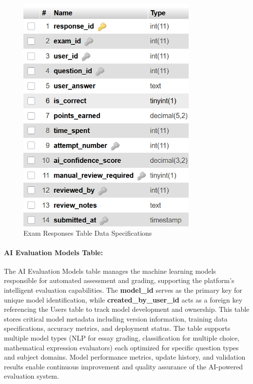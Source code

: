 \documentclass[12pt,a4paper,oneside]{book}
\begin{document}
\begin{figure}[H]
\centering
\includegraphics[width=0.8\textwidth]{assets/DBTable/Table4.8.png}
\caption{Exam Responses Table Data Specifications}
\label{table:exam_responses}
\end{figure}

\clearpage
\paragraph{AI Evaluation Models Table:}
The AI Evaluation Models table manages the machine learning models responsible for automated assessment and grading, supporting the platform's intelligent evaluation capabilities. The \textbf{model\_id} serves as the primary key for unique model identification, while \textbf{created\_by\_user\_id} acts as a foreign key referencing the Users table to track model development and ownership. This table stores critical model metadata including version information, training data specifications, accuracy metrics, and deployment status. The table supports multiple model types (NLP for essay grading, classification for multiple choice, mathematical expression evaluators) each optimized for specific question types and subject domains. Model performance metrics, update history, and validation results enable continuous improvement and quality assurance of the AI-powered evaluation system.
\end{document}

